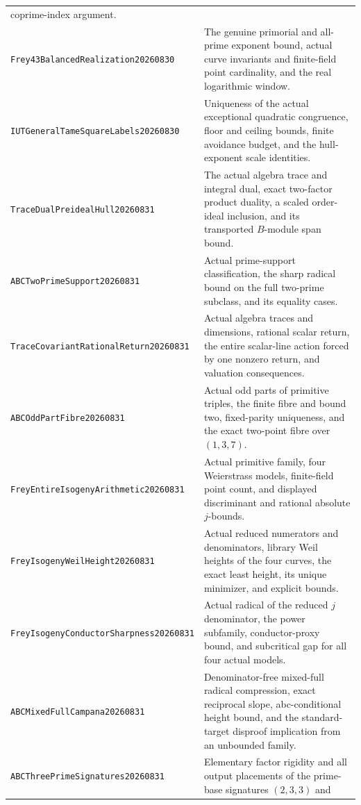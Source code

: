 \documentclass[11pt]{amsart}
\theoremstyle{definition}
\theoremstyle{remark}
\begin{document}
\begin{longtable}{>{\raggedright\arraybackslash}p{}>{\raggedright\arraybackslash}p{}}
coprime-index argument.\\[3pt]
\texttt{Frey43Balanced\allowbreak Realization20260830} & The genuine
primorial and all-prime exponent bound, actual curve invariants and
finite-field point cardinality, and the real logarithmic window.\\[3pt]
\texttt{IUTGeneralTame\allowbreak SquareLabels20260830} & Uniqueness of
the actual exceptional quadratic congruence, floor and ceiling bounds,
finite avoidance budget, and the hull-exponent scale identities.\\
\texttt{TraceDualPreideal\allowbreak Hull20260831} & The actual algebra
trace and integral dual, exact two-factor product duality, a scaled
order-ideal inclusion, and its transported $B$-module span bound.\\
\texttt{ABCTwoPrimeSupport20260831} & Actual prime-support classification,
the sharp radical bound on the full two-prime subclass, and its equality
cases.\\[3pt]
\texttt{TraceCovariantRational\allowbreak Return20260831} & Actual algebra
traces and dimensions, rational scalar return, the entire scalar-line
action forced by one nonzero return, and valuation consequences.\\[3pt]
\texttt{ABCOddPartFibre20260831} & Actual odd parts of primitive triples,
the finite fibre and bound two, fixed-parity uniqueness, and the exact
two-point fibre over $(1,3,7)$.\\[3pt]
\texttt{FreyEntireIsogeny\allowbreak Arithmetic20260831} & Actual primitive
family, four Weierstrass models, finite-field point count, and displayed
discriminant and rational absolute $j$-bounds.\\[3pt]
\texttt{FreyIsogenyWeil\allowbreak Height20260831} & Actual reduced
numerators and denominators, library Weil heights of the four curves,
the exact least height, its unique minimizer, and explicit bounds.\\
\texttt{FreyIsogenyConductor\allowbreak Sharpness20260831} & Actual radical
of the reduced $j$ denominator, the power subfamily, conductor-proxy bound,
and subcritical gap for all four actual models.\\[3pt]
\texttt{ABCMixedFullCampana20260831} & Denominator-free mixed-full radical
compression, exact reciprocal slope, abc-conditional height bound, and the
standard-target disproof implication from an unbounded family.\\[3pt]
\texttt{ABCThreePrimeSignatures20260831} & Elementary factor rigidity and
all output placements of the prime-base signatures $(2,3,3)$ and

\end{longtable}
\end{document}
